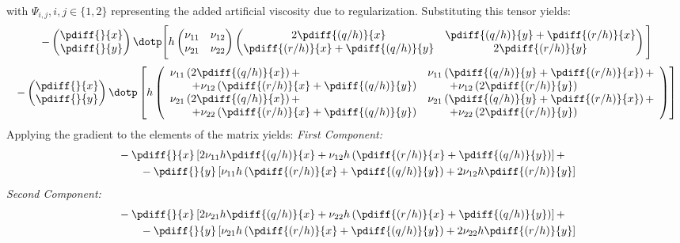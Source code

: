 with $\Psi_{i,j}, i,j \in \{1,2\}$ representing the added artificial viscosity due to regularization.
Substituting this tensor yields:
\begin{align}
- %
\begin{pmatrix}
    \pdiff{}{x} \\
    \pdiff{}{y}
\end{pmatrix}
\dotp
\Bigg[
h
\begin{pmatrix}
    \nu_{11} & \nu_{12} \\
    \nu_{21}  & \nu_{22}
\end{pmatrix}
\begin{pmatrix}
    2\pdiff{(q/h)}{x} & \pdiff{(q/h)}{y} + \pdiff{(r/h)}{x}
    \\
    \pdiff{(r/h)}{x} + \pdiff{(q/h)}{y} & 2\pdiff{(r/h)}{y}
\end{pmatrix}
\Bigg]
\end{align}
%
\begin{align}
- %
    \begin{pmatrix}
        \pdiff{}{x} \\
        \pdiff{}{y}
    \end{pmatrix}
    \dotp
    \left[
    h
 \left(
\begin{array}{ll}
    \nu_{11} \left( 2\pdiff{(q/h)}{x} \right) + &
    \nu_{11} \left( \pdiff{(q/h)}{y} + \pdiff{(r/h)}{x} \right) +
    \\
    \qquad + \nu_{12} \left( \pdiff{(r/h)}{x} + \pdiff{(q/h)}{y} \right) & \qquad + \nu_{12} \left( 2 \pdiff{(r/h)}{y} \right) \\
    \nu_{21} \left( 2\pdiff{(q/h)}{x} \right)  + &
    \nu_{21} \left( \pdiff{(q/h)}{y} + \pdiff{(r/h)}{x} \right) +
    \\
    \qquad + \nu_{22} \left( \pdiff{(r/h)}{x} + \pdiff{(q/h)}{y} \right)
    &
    \qquad + \nu_{22} \left( 2 \pdiff{(r/h)}{y} \right)
\end{array}
\right)
    \right]
\end{align}
Applying the gradient to the elements of the matrix yields:
%
\newline\textit{First Component:}
\begin{align}
    &-\pdiff{}{x} \left[  2 \nu_{11} h \pdiff{(q/h)}{x} + \nu_{12} h \left(\pdiff{(r/h)}{x} + \pdiff{(q/h)}{y}\right) \right] +
    \\
    &\qquad
    - \pdiff{}{y} \left[ \nu_{11} h \left( \pdiff{(r/h)}{x} + \pdiff{(q/h)}{y}  \right) + 2 \nu_{12} h \pdiff{(r/h)}{y} \right]
\end{align}
\textit{Second Component:}
\begin{align}
    &-\pdiff{}{x} \left[ 2 \nu_{21} h \pdiff{(q/h)}{x} + \nu_{22}  h \left(\pdiff{(r/h)}{x} + \pdiff{(q/h)}{y}\right) \right] +
    \\
    &\qquad
    - \pdiff{}{y} \left[ \nu_{21} h \left(\pdiff{(r/h)}{x} + \pdiff{(q/h)}{y}\right) + 2 \nu_{22} h \pdiff{(r/h)}{y} \right]
\end{align}
